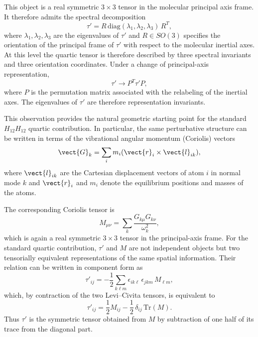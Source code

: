 This object is a real symmetric $3\times 3$ tensor in the molecular principal
axis frame.  It therefore admits the spectral decomposition
\begin{equation}
\tau' = R\,\mathrm{diag}(\lambda_1,\lambda_2,\lambda_3)\,R^{T},
\label{eq:tauprime_spectral}
\end{equation}
where $\lambda_1,\lambda_2,\lambda_3$ are the eigenvalues of $\tau'$ and
$R\in SO(3)$ specifies the orientation of the principal frame of $\tau'$ with
respect to the molecular inertial axes.  At this level the quartic tensor is
therefore described by three spectral invariants and three orientation
coordinates.  Under a change of principal-axis representation,
\begin{equation}
\tau' \longrightarrow P^{T}\tau' P,
\end{equation}
where $P$ is the permutation matrix associated with the relabeling of the
inertial axes.  The eigenvalues of $\tau'$ are therefore representation
invariants.

This observation provides the natural geometric starting point for the standard
$H_{12}H_{12}$ quartic contribution.  In particular, the same perturbative
structure can be written in terms of the vibrational angular momentum
(Coriolis) vectors
\begin{equation}
\vect{G}_k =
\sum_i
m_i
(\vect{r}_i \times \vect{l}_{ik}),
\end{equation}
where $\vect{l}_{ik}$ are the Cartesian displacement vectors of atom
$i$ in normal mode $k$ and $\vect{r}_i$ and $m_i$ denote the equilibrium
positions and masses of the atoms.\cite{Mills1972,Wilson1955}

The corresponding Coriolis tensor is
\begin{equation}
M_{\mu\nu}=
\sum_k \frac{G_{k\mu}G_{k\nu}}{\omega_k^2},
\label{eq:Mtensor}
\end{equation}
which is again a real symmetric $3\times3$ tensor in the principal-axis frame.
For the standard quartic contribution, $\tau'$ and $M$ are not independent
objects but two tensorially equivalent representations of the same spatial
information.  Their relation can be written in component form as
\begin{equation}
\tau'_{ij}
=
-\frac12
\sum_{k\ell m}
\epsilon_{ik\ell}\,\epsilon_{jkm}\,M_{\ell m},
\label{eq:tauprime_from_M_components}
\end{equation}
which, by contraction of the two Levi--Civita tensors, is equivalent to
\begin{equation}
\tau'_{ij}
=
\frac12 M_{ij}
-\frac12\,\delta_{ij}\,\mathrm{Tr}(M).
\label{eq:tauprime_from_M_matrix}
\end{equation}
Thus $\tau'$ is the symmetric tensor obtained from $M$ by subtraction of one
half of its trace from the diagonal part.

